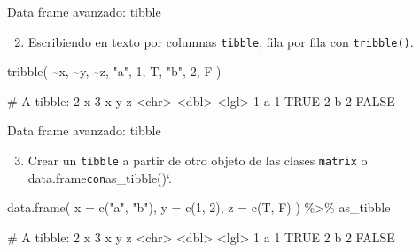 \documentclass[
  ignorenonframetext,
  aspectratio=169]{beamer}
\newenvironment{Shaded}{\begin{snugshade}}{\end{snugshade}}
\newcommand{\AttributeTok}[1]{\textcolor[rgb]{0.77,0.63,0.00}{#1}}
\newcommand{\DecValTok}[1]{\textcolor[rgb]{0.00,0.00,0.81}{#1}}
\newcommand{\FunctionTok}[1]{\textcolor[rgb]{0.00,0.00,0.00}{#1}}
\newcommand{\NormalTok}[1]{#1}
\newcommand{\SpecialCharTok}[1]{\textcolor[rgb]{0.00,0.00,0.00}{#1}}
\newcommand{\StringTok}[1]{\textcolor[rgb]{0.31,0.60,0.02}{#1}}
\providecommand{\tightlist}{%
  \setlength{\itemsep}{0pt}\setlength{\parskip}{0pt}}
\let\oldverbatim\verbatim
\let\endoldverbatim\endverbatim
\renewenvironment{verbatim}{\tiny\oldverbatim}{\endoldverbatim}
\begin{document}
\begin{frame}[fragile]{Data frame avanzado: tibble}
\protect\hypertarget{data-frame-avanzado-tibble-1}{}
\begin{enumerate}
\setcounter{enumi}{1}
\tightlist
\item
  Escribiendo en texto por columnas \texttt{tibble}, fila por fila con
  \texttt{tribble()}.
\end{enumerate}

\begin{Shaded}
\begin{Highlighting}[]
\FunctionTok{tribble}\NormalTok{(}
  \SpecialCharTok{\textasciitilde{}}\NormalTok{x, }\SpecialCharTok{\textasciitilde{}}\NormalTok{y, }\SpecialCharTok{\textasciitilde{}}\NormalTok{z,}
  \StringTok{"a"}\NormalTok{, }\DecValTok{1}\NormalTok{, T,}
  \StringTok{"b"}\NormalTok{, }\DecValTok{2}\NormalTok{, F}
\NormalTok{)}
\end{Highlighting}
\end{Shaded}

\begin{verbatim}
# A tibble: 2 x 3
  x         y z    
  <chr> <dbl> <lgl>
1 a         1 TRUE 
2 b         2 FALSE
\end{verbatim}
\end{frame}

\begin{frame}[fragile]{Data frame avanzado: tibble}
\protect\hypertarget{data-frame-avanzado-tibble-2}{}
\begin{enumerate}
\setcounter{enumi}{2}
\tightlist
\item
  Crear un \texttt{tibble} a partir de otro objeto de las clases
  \texttt{matrix} o data.frame\texttt{con}as\_tibble()`.
\end{enumerate}

\begin{Shaded}
\begin{Highlighting}[]
\FunctionTok{data.frame}\NormalTok{(}
  \AttributeTok{x =} \FunctionTok{c}\NormalTok{(}\StringTok{"a"}\NormalTok{, }\StringTok{"b"}\NormalTok{),}
  \AttributeTok{y =} \FunctionTok{c}\NormalTok{(}\DecValTok{1}\NormalTok{, }\DecValTok{2}\NormalTok{),}
  \AttributeTok{z =} \FunctionTok{c}\NormalTok{(T, F)}
\NormalTok{) }\SpecialCharTok{\%\textgreater{}\%} 
\NormalTok{as\_tibble}
\end{Highlighting}
\end{Shaded}

\begin{verbatim}
# A tibble: 2 x 3
  x         y z    
  <chr> <dbl> <lgl>
1 a         1 TRUE 
2 b         2 FALSE
\end{verbatim}
\end{frame}
\end{document}
